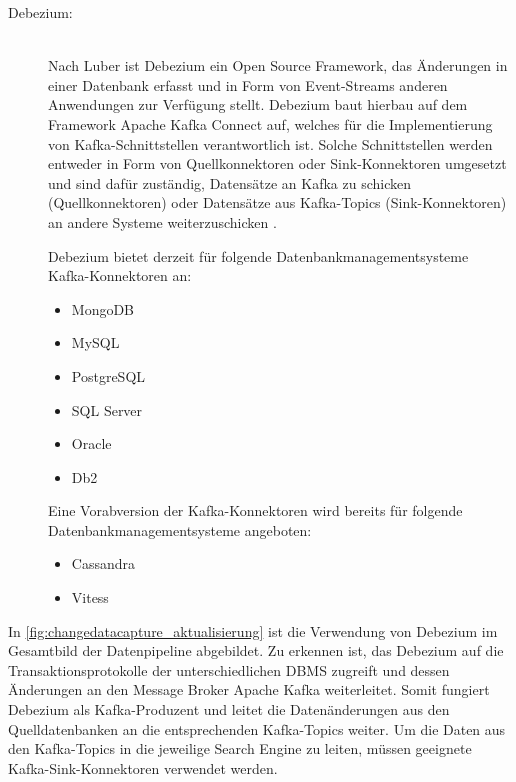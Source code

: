 \begin{description}
\item[Debezium:]\hfill \\
    Nach Luber \cite{StefanLuber.2021} ist Debezium ein Open Source Framework, das Änderungen in einer Datenbank erfasst und in Form von Event-Streams anderen Anwendungen zur Verfügung stellt. Debezium baut hierbau auf dem Framework \glqq Apache Kafka Connect\grqq{} auf, welches für die Implementierung von Kafka-Schnittstellen verantwortlich ist. Solche Schnittstellen werden entweder in Form von Quellkonnektoren oder Sink-Konnektoren umgesetzt und sind dafür zuständig, Datensätze an Kafka zu schicken (Quellkonnektoren) oder Datensätze aus Kafka-Topics (Sink-Konnektoren) an andere Systeme weiterzuschicken \cite{DebeziumCommunity.2021b}.
    
    Debezium bietet derzeit für folgende Datenbankmanagementsysteme Kafka-Konnektoren an: \cite{DebeziumCommunity.2021}

    \begin{itemize}
        \item MongoDB
        \item MySQL
        \item PostgreSQL
        \item SQL Server
        \item Oracle
        \item Db2
    \end{itemize}

    Eine Vorabversion der Kafka-Konnektoren wird bereits für folgende Datenbankmanagementsysteme angeboten: \cite{DebeziumCommunity.2021}

    \begin{itemize}
        \item Cassandra
        \item Vitess
    \end{itemize}

\end{description}

In \autoref{fig:changedatacapture_aktualisierung} ist die Verwendung von Debezium im Gesamtbild der Datenpipeline abgebildet. Zu erkennen ist, das Debezium auf die Transaktionsprotokolle der unterschiedlichen DBMS zugreift und dessen Änderungen an den Message Broker Apache Kafka weiterleitet. Somit fungiert Debezium als Kafka-Produzent und leitet die Datenänderungen aus den Quelldatenbanken an die entsprechenden Kafka-Topics weiter. Um die Daten aus den Kafka-Topics in die jeweilige Search Engine zu leiten, müssen geeignete Kafka-Sink-Konnektoren verwendet werden.

